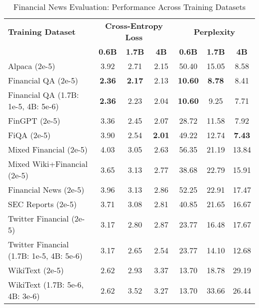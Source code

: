 
\begin{table}[htbp]
\centering
\caption[Financial News Evaluation: Cross-Dataset Performance]{Financial News Evaluation: Performance Across Training Datasets}
\label{tab:cross_financial_news}
\begin{tabular}{l|ccc|ccc}
\hline
\textbf{Training Dataset} & \multicolumn{3}{c|}{\textbf{Cross-Entropy Loss}} & \multicolumn{3}{c}{\textbf{Perplexity}} \\
\cline{2-4} \cline{5-7}
  & \textbf{0.6B} & \textbf{1.7B} & \textbf{4B} & \textbf{0.6B} & \textbf{1.7B} & \textbf{4B} \\
Alpaca (2e-5) & 3.92 & 2.71 & 2.15 & 50.40 & 15.05 & 8.58  \\
Financial QA (2e-5) & \textbf{2.36} & \textbf{2.17} & 2.13 & \textbf{10.60} & \textbf{8.78} & 8.41  \\
Financial QA (1.7B: 1e-5, 4B: 5e-6) & \textbf{2.36} & 2.23 & 2.04 & \textbf{10.60} & 9.25 & 7.71  \\
FinGPT (2e-5) & 3.36 & 2.45 & 2.07 & 28.72 & 11.58 & 7.92  \\
FiQA (2e-5) & 3.90 & 2.54 & \textbf{2.01} & 49.22 & 12.74 & \textbf{7.43}  \\
Mixed Financial (2e-5) & 4.03 & 3.05 & 2.63 & 56.35 & 21.19 & 13.84  \\
Mixed Wiki+Financial (2e-5) & 3.65 & 3.13 & 2.77 & 38.68 & 22.79 & 15.91  \\
Financial News (2e-5) & 3.96 & 3.13 & 2.86 & 52.25 & 22.91 & 17.47  \\
SEC Reports (2e-5) & 3.71 & 3.08 & 2.81 & 40.85 & 21.65 & 16.67  \\
Twitter Financial (2e-5) & 3.17 & 2.80 & 2.87 & 23.77 & 16.48 & 17.67  \\
Twitter Financial (1.7B: 1e-5, 4B: 5e-6) & 3.17 & 2.65 & 2.54 & 23.77 & 14.10 & 12.68  \\
WikiText (2e-5) & 2.62 & 2.93 & 3.37 & 13.70 & 18.78 & 29.19  \\
WikiText (1.7B: 5e-6, 4B: 3e-6) & 2.62 & 3.52 & 3.27 & 13.70 & 33.66 & 26.44  \\
\hline
\end{tabular}
\end{table}

